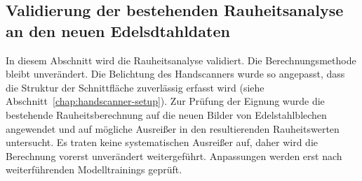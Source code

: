 \subsection{Validierung der bestehenden Rauheitsanalyse an den neuen Edelsdtahldaten}
In diesem Abschnitt wird die Rauheitsanalyse validiert. Die Berechnungsmethode bleibt unverändert. Die Belichtung des Handscanners wurde so angepasst, dass die Struktur der Schnittfläche zuverlässig erfasst wird (siehe Abschnitt~\ref{chap:handscanner-setup}). Zur Prüfung der Eignung wurde die bestehende Rauheitsberechnung auf die neuen Bilder von Edelstahlblechen angewendet und auf mögliche Ausreißer in den resultierenden Rauheitswerten untersucht. Es traten keine systematischen Ausreißer auf, daher wird die Berechnung vorerst unverändert weitergeführt. Anpassungen werden erst nach weiterführenden Modelltrainings geprüft.
